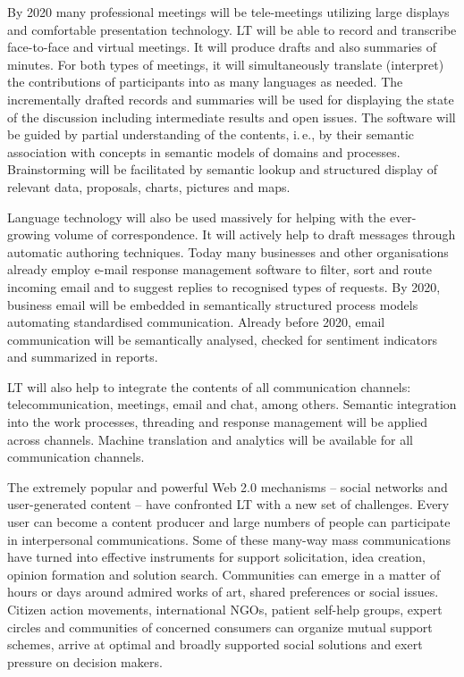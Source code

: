 \documentclass[10pt, plain]{../../metanetpaper}
\begin{document}
\begin{multicols}{2}
By 2020 many professional meetings will be tele-meetings utilizing large displays and comfortable presentation technology. LT will be able to record and transcribe face-to-face and virtual meetings. It will produce drafts and also summaries of minutes. For both types of meetings, it will simultaneously translate (interpret) the contributions of participants into as many languages as needed. The incrementally drafted records and summaries will be used for displaying the state of the discussion including intermediate results and open issues. The software will be guided by partial understanding of the contents, i.\,e., by their semantic association with concepts in semantic models of domains and processes. Brainstorming will be facilitated by semantic lookup and structured display of relevant data, proposals, charts, pictures and maps.
 
Language technology will also be used massively for helping with the ever-growing volume of correspondence. It will actively help to draft messages through automatic authoring techniques. Today many businesses and other organisations already employ e-mail response management software to filter, sort and route incoming email and to suggest replies to recognised types of requests. By 2020, business email will be embedded in semantically structured process models automating standardised communication. Already before 2020, email communication will be semantically analysed, checked for sentiment indicators and summarized in reports.
 
LT will also help to integrate the contents of all communication channels: telecommunication, meetings, email and chat, among others. Semantic integration into the work processes, threading and response management will be applied across channels. Machine translation and analytics will be available for all communication channels.
 
The extremely popular and powerful Web 2.0 mechanisms -- social networks and user-generated content -- have confronted LT with a new set of challenges. Every user can become a content producer and large numbers of people can participate in interpersonal communications. Some of these many-way mass communications have turned into effective instruments for support solicitation, idea creation, opinion formation and solution search. Communities can emerge in a matter of hours or days around admired works of art, shared preferences or social issues. Citizen action movements, international NGOs, patient self-help groups, expert circles and communities of concerned consumers can organize mutual support schemes, arrive at optimal and broadly supported social solutions and exert pressure on decision makers.
 

\end{multicols}
\end{document}
